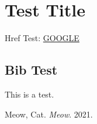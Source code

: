 \documentclass{article}
\begin{document}
\makeatletter
\def\Hy@colorlink#1{%
  \begingroup%
  \HyColor@UseColor#1%
  \begin{hyperbox}
}%
\def\Hy@endcolorlink{\end{hyperbox}\endgroup}%
\makeatother


\tableofcontents
\section{Test Title}
Href Test: \href{www.google.com}{GOOGLE}


\subsection{Bib Test}
This is a test.\cite{meow}
\begin{thebibliography}{1}
\setcounter{enumiv}{15}
 Meow, Cat. \emph{Meow}. 2021.
\end{thebibliography}
\end{document}
